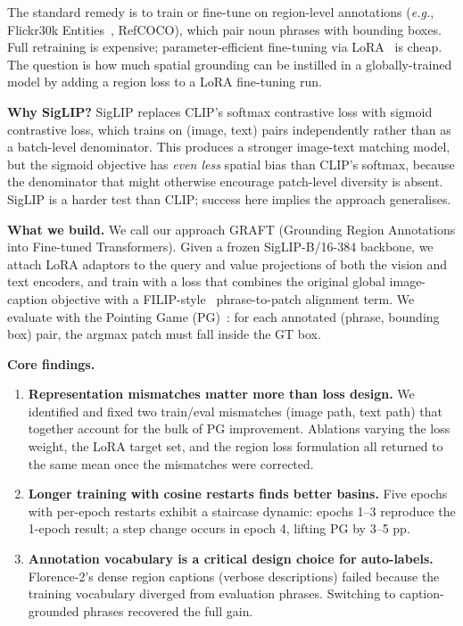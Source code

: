 \documentclass{article}
\newcommand{\eg}{\textit{e.g.}}
\begin{document}
The standard remedy is to train or fine-tune on region-level annotations
(\eg, Flickr30k Entities~\cite{plummer2015flickr30k}, RefCOCO), which pair noun
phrases with bounding boxes. Full retraining is expensive; parameter-efficient
fine-tuning via LoRA~\cite{hu2022lora} is cheap. The question is how much
spatial grounding can be instilled in a globally-trained model by adding a
region loss to a LoRA fine-tuning run.

\textbf{Why SigLIP?} SigLIP replaces CLIP's softmax contrastive loss with
sigmoid contrastive loss, which trains on (image, text) pairs independently
rather than as a batch-level denominator.  This produces a stronger
image-text matching model, but the sigmoid objective has \emph{even less}
spatial bias than CLIP's softmax, because the denominator that might otherwise
encourage patch-level diversity is absent. SigLIP is a harder test than CLIP;
success here implies the approach generalises.

\textbf{What we build.} We call our approach GRAFT (Grounding Region
Annotations into Fine-tuned Transformers). Given a frozen SigLIP-B/16-384
backbone, we attach LoRA adaptors to the query and value projections of both
the vision and text encoders, and train with a loss that combines the original
global image-caption objective with a FILIP-style~\cite{yao2021filip}
phrase-to-patch alignment term. We evaluate with the Pointing Game
(PG)~\cite{zhang2018top}: for each annotated (phrase, bounding box) pair, the
argmax patch must fall inside the GT box.

\textbf{Core findings.}
\begin{enumerate}
\item \textbf{Representation mismatches matter more than loss design.} We
  identified and fixed two train/eval mismatches (image path, text path) that
  together account for the bulk of PG improvement. Ablations varying the loss
  weight, the LoRA target set, and the region loss formulation all returned to
  the same mean once the mismatches were corrected.
\item \textbf{Longer training with cosine restarts finds better basins.} Five
  epochs with per-epoch restarts exhibit a staircase dynamic: epochs 1--3
  reproduce the 1-epoch result; a step change occurs in epoch 4, lifting PG by
  3--5 pp.
\item \textbf{Annotation vocabulary is a critical design choice for auto-labels.}
  Florence-2's dense region captions (verbose descriptions) failed because the
  training vocabulary diverged from evaluation phrases. Switching to
  caption-grounded phrases recovered the full gain.
\end{enumerate}
\end{document}
